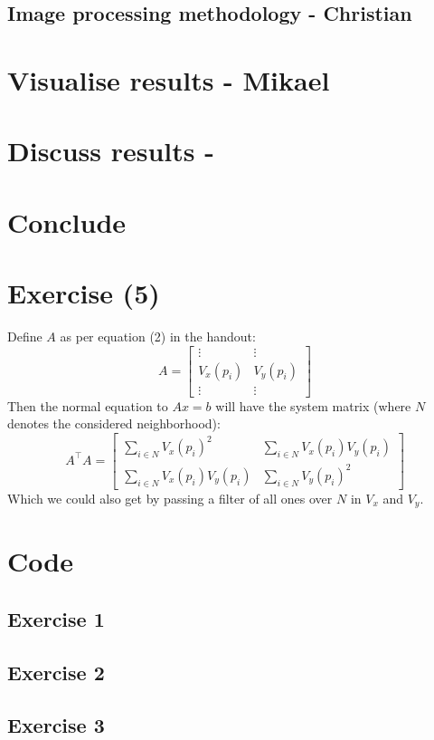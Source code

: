 \documentclass{article}
\begin{document}
\subsection{Image processing methodology - Christian}

\section{Visualise results - Mikael}

\section{Discuss results - }

\section{Conclude}






\section{Exercise (5)}
Define $A$ as per equation (2) in the handout:
\begin{equation}
    A = \begin{bmatrix}
    \vdots & \vdots \\
    V_{x}(p_i) & V_{y}(p_i) \\
    \vdots & \vdots
    \end{bmatrix}
\end{equation}
Then the normal equation to $Ax = b$ will have the system matrix (where $N$ denotes the considered neighborhood):
\begin{equation}
    A^\intercal A = \begin{bmatrix}
        \sum_{i \in N} V_{x}(p_i)^{2} & \sum_{i \in N} V_{x}(p_i)V_{y}(p_i) \\
        \sum_{i \in N} V_{x}(p_i)V_{y}(p_i) & \sum_{i \in N} V_{y}(p_i)^{2}
    \end{bmatrix}
\end{equation}
Which we could also get by passing a filter of all ones over $N$ in $V_x$ and $V_y$.

\newpage
\appendix
\section{Code}
\subsection{Exercise 1}


\subsection{Exercise 2}


\subsection{Exercise 3}

\end{document}

